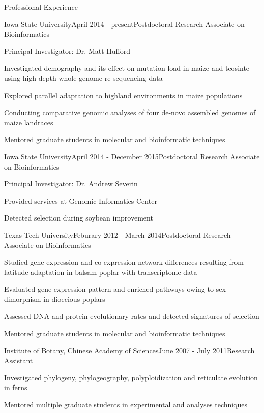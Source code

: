 \documentclass{resume} %
\begin{document}
\begin{rSection}{Professional Experience}

\begin{rSubsection}{Iowa State University}{April 2014 - present}{Postdoctoral Research Associate on Bioinformatics}{}
\item Principal Investigator:  Dr. Matt Hufford
\item Investigated demography and its effect on mutation load in maize and teosinte using high-depth whole genome re-sequencing data
\item Explored parallel adaptation to highland environments in maize populations
\item Conducting comparative genomic analyses of four de-novo assembled genomes of maize landraces
\item Mentored graduate students in molecular and bioinformatic techniques
\end{rSubsection}

\begin{rSubsection}{Iowa State University}{April 2014 - December 2015}{Postdoctoral Research Associate on Bioinformatics}{}
\item Principal Investigator:  Dr. Andrew Severin
\item Provided services at Genomic Informatics Center
\item Detected selection during soybean improvement
\end{rSubsection}

\begin{rSubsection}{Texas Tech University}{Feburary 2012 - March 2014}{Postdoctoral Research Associate on Bioinformatics}{}
\item Studied gene expression and co-expression network differences resulting from latitude adaptation in balsam poplar with transcriptome data
\item Evaluated gene expression pattern and enriched pathways owing to sex dimorphism in dioecious poplars
\item Assessed DNA and protein evolutionary rates and detected signatures of selection
\item Mentored graduate students in molecular and bioinformatic techniques
\end{rSubsection}

\begin{rSubsection}{Institute of Botany, Chinese Academy of Sciences}{June 2007 - July 2011}{Research Assistant}{}
\item Investigated phylogeny, phylogeography, polyploidization and reticulate evolution in ferns
\item Mentored multiple graduate students in experimental and analyses techniques
\end{rSubsection}


\end{rSection}
\end{document}
